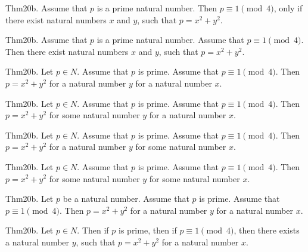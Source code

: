 \documentclass{article}
\begin{document}
Thm20b. Assume that $p$ is a prime natural number. Then $p \equiv 1 \pmod{ 4}$, only if there exist natural numbers $x$ and $y$, such that $p = x ^{ 2}+ y ^{ 2}$.

Thm20b. Assume that $p$ is a prime natural number. Assume that $p \equiv 1 \pmod{ 4}$. Then there exist natural numbers $x$ and $y$, such that $p = x ^{ 2}+ y ^{ 2}$.

Thm20b. Let $p \in N$. Assume that $p$ is prime. Assume that $p \equiv 1 \pmod{ 4}$. Then $p = x ^{ 2}+ y ^{ 2}$ for a natural number $y$ for a natural number $x$.

Thm20b. Let $p \in N$. Assume that $p$ is prime. Assume that $p \equiv 1 \pmod{ 4}$. Then $p = x ^{ 2}+ y ^{ 2}$ for some natural number $y$ for a natural number $x$.

Thm20b. Let $p \in N$. Assume that $p$ is prime. Assume that $p \equiv 1 \pmod{ 4}$. Then $p = x ^{ 2}+ y ^{ 2}$ for a natural number $y$ for some natural number $x$.

Thm20b. Let $p \in N$. Assume that $p$ is prime. Assume that $p \equiv 1 \pmod{ 4}$. Then $p = x ^{ 2}+ y ^{ 2}$ for some natural number $y$ for some natural number $x$.

Thm20b. Let $p$ be a natural number. Assume that $p$ is prime. Assume that $p \equiv 1 \pmod{ 4}$. Then $p = x ^{ 2}+ y ^{ 2}$ for a natural number $y$ for a natural number $x$.

Thm20b. Let $p \in N$. Then if $p$ is prime, then if $p \equiv 1 \pmod{ 4}$, then there exists a natural number $y$, such that $p = x ^{ 2}+ y ^{ 2}$ for a natural number $x$.
\end{document}
